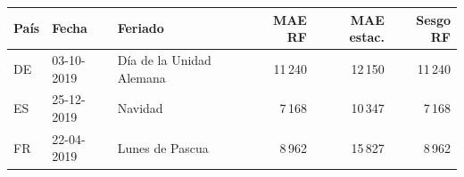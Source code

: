 \begin{tabular}{llp{4.0cm}rrr}
\toprule
País & Fecha & Feriado & MAE RF & MAE estac. & Sesgo RF \\
\midrule
DE & 03-10-2019 & Día de la Unidad Alemana & 11\,240 & 12\,150 & 11\,240 \\
ES & 25-12-2019 & Navidad & 7\,168 & 10\,347 & 7\,168 \\
FR & 22-04-2019 & Lunes de Pascua & 8\,962 & 15\,827 & 8\,962 \\
\bottomrule
\end{tabular}